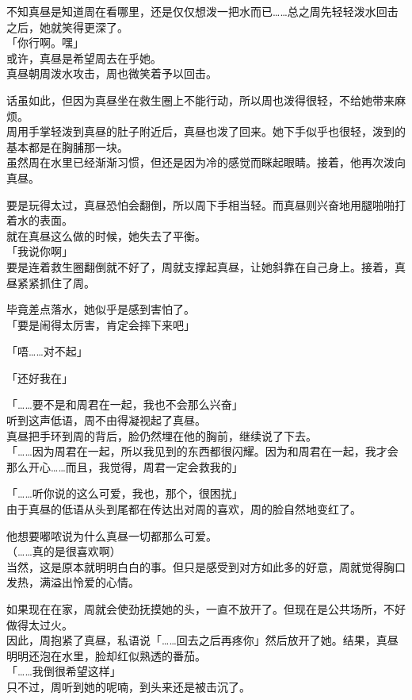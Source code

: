 不知真昼是知道周在看哪里，还是仅仅想泼一把水而已……总之周先轻轻泼水回击之后，她就笑得更深了。\\

「你行啊。嘿」\\

或许，真昼是希望周去在乎她。\\

真昼朝周泼水攻击，周也微笑着予以回击。

话虽如此，但因为真昼坐在救生圈上不能行动，所以周也泼得很轻，不给她带来麻烦。\\

周用手掌轻泼到真昼的肚子附近后，真昼也泼了回来。她下手似乎也很轻，泼到的基本都是在胸脯那一块。\\

虽然周在水里已经渐渐习惯，但还是因为冷的感觉而眯起眼睛。接着，他再次泼向真昼。

要是玩得太过，真昼恐怕会翻倒，所以周下手相当轻。而真昼则兴奋地用腿啪啪打着水的表面。\\

就在真昼这么做的时候，她失去了平衡。\\

「我说你啊」\\

要是连着救生圈翻倒就不好了，周就支撑起真昼，让她斜靠在自己身上。接着，真昼紧紧抓住了周。

毕竟差点落水，她似乎是感到害怕了。\\

「要是闹得太厉害，肯定会摔下来吧」

「唔……对不起」

「还好我在」

「……要不是和周君在一起，我也不会那么兴奋」\\

听到这声低语，周不由得凝视起了真昼。\\

真昼把手环到周的背后，脸仍然埋在他的胸前，继续说了下去。\\

「……因为周君在一起，所以我见到的东西都很闪耀。因为和周君在一起，我才会那么开心……而且，我觉得，周君一定会救我的」

「……听你说的这么可爱，我也，那个，很困扰」\\

由于真昼的低语从头到尾都在传达出对周的喜欢，周的脸自然地变红了。

他想要嘟哝说为什么真昼一切都那么可爱。\\

（……真的是很喜欢啊）\\

当然，这是原本就明明白白的事。但只是感受到对方如此多的好意，周就觉得胸口发热，满溢出怜爱的心情。

如果现在在家，周就会使劲抚摸她的头，一直不放开了。但现在是公共场所，不好做得太过火。\\

因此，周抱紧了真昼，私语说「……回去之后再疼你」然后放开了她。结果，真昼明明还泡在水里，脸却红似熟透的番茄。\\

「……我倒很希望这样」\\

只不过，周听到她的呢喃，到头来还是被击沉了。
